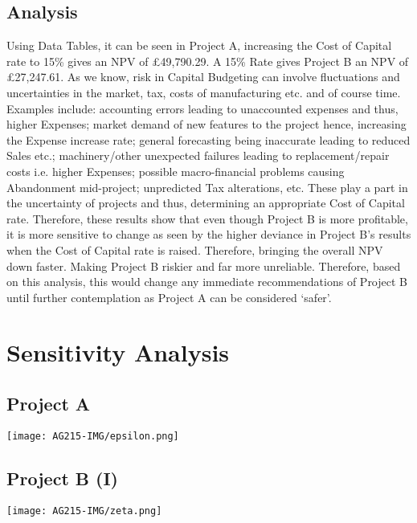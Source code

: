 \documentclass[11pt, english]{article}
\begin{document}
	\subsection{Analysis}

	Using Data Tables, it can be seen in Project A, increasing the Cost of Capital rate to 15\% gives an NPV of £49,790.29. A 15\% Rate gives Project B an NPV of \pounds27,247.61. As we know, risk in Capital Budgeting can involve fluctuations and uncertainties in the market, tax, costs of manufacturing etc. and of course time. Examples include: accounting errors leading to unaccounted expenses and thus, higher Expenses; market demand of new features to the project hence, increasing the Expense increase rate; general forecasting being inaccurate leading to reduced Sales etc.; machinery/other unexpected failures leading to replacement/repair costs i.e. higher Expenses; possible macro-financial problems causing Abandonment mid-project; unpredicted Tax alterations, etc. These play a part in the uncertainty of projects and thus, determining an appropriate Cost of Capital rate. Therefore, these results show that even though Project B is more profitable, it is more sensitive to change as seen by the higher deviance in Project B's results when the Cost of Capital rate is raised. Therefore, bringing the overall NPV down faster. Making Project B riskier and far more unreliable. Therefore, based on this analysis, this would change any immediate recommendations of Project B until further contemplation as Project A can be considered `safer'.

\newpage

\section{Sensitivity Analysis}	

	\subsection{Project A}

	\begin{center}
                \texttt{[image: AG215-IMG/epsilon.png]}
        \end{center}

	\subsection{Project B (I)}

	\begin{center}
                \texttt{[image: AG215-IMG/zeta.png]}
        \end{center} 
\end{document}
